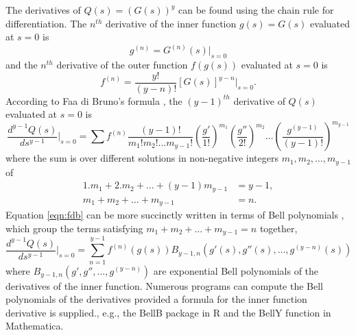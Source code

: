 \documentclass{imammb}
\numberwithin{equation}{section}
\begin{document}
The derivatives of $Q(s) = (G(s))^y$ can be found using the chain rule for differentiation. The $n^{th}$ derivative of the inner function $g(s) = G(s)$ evaluated at $s=0$ is
\begin{equation}\label{eqn:g}
    g^{(n)}=  G^{(n)}(s)  \Bigr|_{s=0}
\end{equation}
and the $n^{th}$ derivative of the outer function $f(g(s))$ evaluated at $s=0$ is
\begin{equation}\label{eqn:f}
    f^{(n)}= \frac{y!}{(y-n)!} [G(s)]^{y-n}  \Bigr|_{s=0}.
\end{equation}
According to Faa di Bruno's formula \citep{Johnson2002-nq}, the $(y-1)^{th}$ derivative of $Q(s)$ evaluated at $s=0$ is
\begin{equation}\label{eqn:fdb}
    \frac{d^{y-1} Q(s)}{ds^{y-1}} \Bigr|_{s=0} = \sum  f^{(n)} \frac{(y-1)!}{m_1! m_2! \dots m_{y-1}!} \left ( \frac{g'}{1!}\right )^{m_1} \left ( \frac{g''}{2!} \right )^{m_2}\dots \left ( \frac{g^{(y-1)}}{(y-1)!} \right )^{m_{y-1}}
\end{equation}
where the sum is over different solutions in non-negative integers $m_1, m_2, \dots, m_{y-1}$ of
\begin{align*}
    1. m_1 + 2. m_2 + \dots + (y-1) m_{y-1} &= y-1,\\
     m_1 + m_2 + \dots + m_{y-1} &= n.
\end{align*}
Equation \eqref{eqn:fdb} can be more succinctly written in terms of Bell polynomials \citep{Johnson2002-nq, Cvijovic2011-ml}, which group the terms satisfying $m_1 + m_2 + \dots + m_{y-1} = n$ together,
\begin{equation}\label{eqn:fdbbell}
    \frac{d^{y-1} Q(s)}{ds^{y-1}} \Bigr|_{s=0} = \sum_{n=1}^{y-1}  f^{(n)}(g(s)) B_{y-1,n}(g'(s), g''(s), \dots, g^{(y-n)}(s))
\end{equation}
where $B_{y-1,n}(g', g'', \dots, g^{(y-n)})$ are exponential Bell polynomials of the derivatives of the inner function. Numerous programs can compute the Bell polynomials of the derivatives provided a formula for the inner function derivative is supplied., e.g., the BellB package in R and the BellY function in Mathematica.
\end{document}
